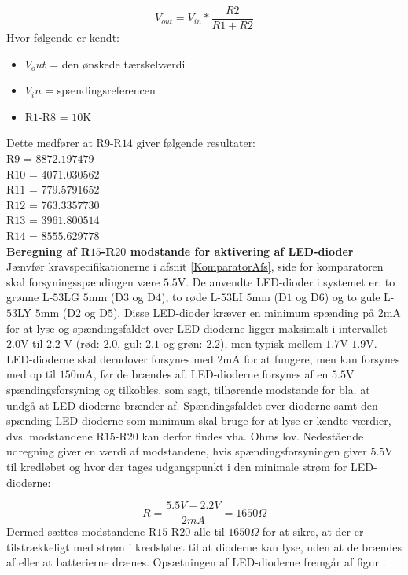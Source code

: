 \begin{equation}
V_{out}=V_{in}*\dfrac{R2}{R1+R2}
\end{equation}
Hvor følgende er kendt:
\begin{itemize}
\item $V_out$ = den ønskede tærskelværdi
\item $V_in$ = spændingsreferencen
\item R$1$-R$8$ = $10$K
\end{itemize}

Dette medfører at R$9$-R$14$ giver følgende resultater:\\
R$9$ = $8872.197479$\\
R$10$ = $4071.030562$ \\
R$11$ = $779.5791652$ \\
R$12$ = $763.3357730$ \\
R$13$ = $3961.800514$ \\
R$14$ = $8555.629778$ \\


\noindent\textbf{Beregning af R$15$-R$20$ modstande for aktivering af LED-dioder} \\
Jænvfør kravspecifikationerne i afsnit \ref{KomparatorAfs}, side \pageref{KomparatorAfs} for komparatoren skal forsyningsspændingen være $5.5$V. De anvendte LED-dioder i systemet er: to grønne L-$53$LG $5$mm (D$3$ og D$4$), to røde L-$53$LI $5$mm (D$1$ og D$6$) og to gule L-$53$LY $5$mm (D$2$ og D$5$). Disse LED-dioder kræver en minimum spænding på 2mA for at lyse og spændingsfaldet over LED-dioderne ligger maksimalt i intervallet $2.0$V til $2.2$ V (rød: $2.0$, gul: $2.1$ og grøn: $2.2$), men typisk mellem $1.7$V-$1.9$V. LED-dioderne skal derudover forsynes med $2$mA for at fungere, men kan forsynes med op til $150$mA, før de brændes af. LED-dioderne forsynes af en $5.5$V spændingsforsyning og tilkobles, som sagt, tilhørende modstande for bla. at undgå at LED-dioderne brænder af. Spændingsfaldet over dioderne samt den spænding LED-dioderne som minimum skal bruge for at lyse er kendte værdier, dvs. modstandene R$15$-R$20$ kan derfor findes vha. Ohms lov. Nedestående udregning giver en værdi af modstandene, hvis spændingsforsyningen giver $5.5$V til kredløbet og hvor der tages udgangspunkt i den minimale strøm for LED-dioderne:

\begin{equation}
R = \dfrac{5.5V - 2.2V}{2mA} = 1650\Omega
\end{equation}
\noindent Dermed sættes modstandene R$15$-R$20$ alle til $1650\Omega$ for at sikre, at der er tilstrækkeligt med strøm i kredsløbet til at dioderne kan lyse, uden at de brændes af eller at batterierne drænes. Opsætningen af LED-dioderne fremgår af figur .

